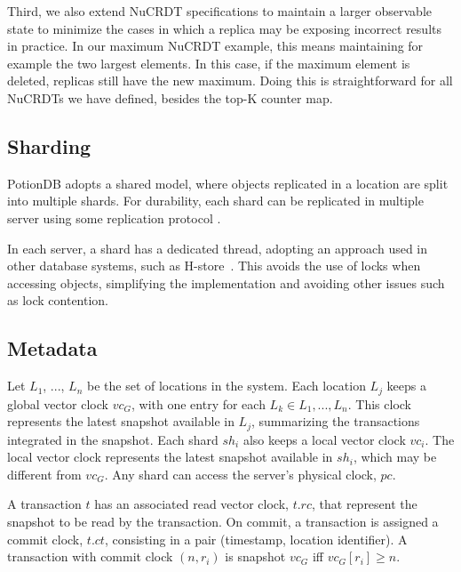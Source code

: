 \documentclass[sigconf, nonacm]{acmart}
\newcommand{\nuno}[1]{\nbnote{Nuno}{red}{#1}}
\begin{document}
Third, we also extend NuCRDT specifications to maintain a larger observable state to minimize the 
cases in which a replica may be exposing incorrect results in practice.  In our maximum NuCRDT example,
this means maintaining for example the two largest elements. In this case, if the maximum element
is deleted, replicas still have the new maximum. 
Doing this is straightforward for all NuCRDTs we have defined, besides the top-K counter map. 

\nuno{explicar como fazer?}


\subsection{Sharding}
\label{subsec:sharding}

PotionDB adopts a shared model, where objects replicated in a location are 
split into multiple shards. For durability, each shard can be replicated in multiple
server using some replication protocol \cite{paxos,raft,chainreplication}.

In each server,  a shard has a dedicated thread, adopting an approach used in other
database systems, such as H-store~\cite{h-store}. This avoids the use of locks when 
accessing objects, simplifying the implementation and avoiding other issues 
such as lock contention.

\subsection{Metadata}

Let $L_1$, ..., $L_n$ be the set of locations in the system. 
Each location $L_j$ keeps a global vector clock $\mathit{vc}_G$, with one entry for each $L_k \in L_1, ..., L_n$.
This clock represents the latest snapshot available in $L_j$, summarizing the transactions integrated in the snapshot.
Each shard $\mathit{sh}_i$ also keeps a local vector clock $\mathit{vc}_i$.
The local vector clock represents the latest snapshot available in $sh_i$, which may be different 
from $\mathit{vc}_G$.
Any shard can access the server's physical clock, $\mathit{pc}$.

A transaction $t$ has an associated read vector clock, $t\!.\mathit{rc}$,  that represent the snapshot
to be read by the transaction. On commit, a transaction is assigned a commit clock, $t\!.\mathit{ct}$, consisting in a 
pair (timestamp, location identifier).  A transaction with commit clock $(n,r_i)$ is snapshot $\mathit{vc}_G$ iff
$\mathit{vc}_G[r_i] \geq n$.
\end{document}
